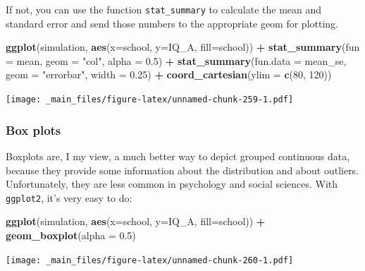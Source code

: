 \documentclass[
]{scrartcl}
\newenvironment{Shaded}{\begin{snugshade}}{\end{snugshade}}
\newcommand{\AttributeTok}[1]{\textcolor[rgb]{0.13,0.29,0.53}{#1}}
\newcommand{\DecValTok}[1]{\textcolor[rgb]{0.00,0.00,0.81}{#1}}
\newcommand{\FloatTok}[1]{\textcolor[rgb]{0.00,0.00,0.81}{#1}}
\newcommand{\FunctionTok}[1]{\textcolor[rgb]{0.13,0.29,0.53}{\textbf{#1}}}
\newcommand{\NormalTok}[1]{#1}
\newcommand{\SpecialCharTok}[1]{\textcolor[rgb]{0.81,0.36,0.00}{\textbf{#1}}}
\newcommand{\StringTok}[1]{\textcolor[rgb]{0.31,0.60,0.02}{#1}}
\begin{document}
If not, you can use the function \texttt{stat\_summary} to calculate the mean and standard error and send those numbers to the appropriate geom for plotting.

\begin{Shaded}
\begin{Highlighting}[]
\FunctionTok{ggplot}\NormalTok{(simulation, }\FunctionTok{aes}\NormalTok{(}\AttributeTok{x=}\NormalTok{school, }\AttributeTok{y=}\NormalTok{IQ\_A, }\AttributeTok{fill=}\NormalTok{school)) }\SpecialCharTok{+}
  \FunctionTok{stat\_summary}\NormalTok{(}\AttributeTok{fun =}\NormalTok{ mean, }\AttributeTok{geom =} \StringTok{"col"}\NormalTok{, }\AttributeTok{alpha =} \FloatTok{0.5}\NormalTok{) }\SpecialCharTok{+}
  \FunctionTok{stat\_summary}\NormalTok{(}\AttributeTok{fun.data =}\NormalTok{ mean\_se, }\AttributeTok{geom =} \StringTok{"errorbar"}\NormalTok{, }\AttributeTok{width =} \FloatTok{0.25}\NormalTok{) }\SpecialCharTok{+}
  \FunctionTok{coord\_cartesian}\NormalTok{(}\AttributeTok{ylim =} \FunctionTok{c}\NormalTok{(}\DecValTok{80}\NormalTok{, }\DecValTok{120}\NormalTok{))}
\end{Highlighting}
\end{Shaded}

\texttt{[image: \_main\_files/figure-latex/unnamed-chunk-259-1.pdf]}

\subsubsection{Box plots}\label{box-plots}

Boxplots are, I my view, a much better way to depict grouped continuous data, because they provide some information about the distribution and about outliers. Unfortunately, they are less common in psychology and social sciences. With \texttt{ggplot2}, it's very easy to do:

\begin{Shaded}
\begin{Highlighting}[]
\FunctionTok{ggplot}\NormalTok{(simulation, }\FunctionTok{aes}\NormalTok{(}\AttributeTok{x=}\NormalTok{school, }\AttributeTok{y=}\NormalTok{IQ\_A, }\AttributeTok{fill=}\NormalTok{school)) }\SpecialCharTok{+}
  \FunctionTok{geom\_boxplot}\NormalTok{(}\AttributeTok{alpha =} \FloatTok{0.5}\NormalTok{)}
\end{Highlighting}
\end{Shaded}

\texttt{[image: \_main\_files/figure-latex/unnamed-chunk-260-1.pdf]}
\end{document}
